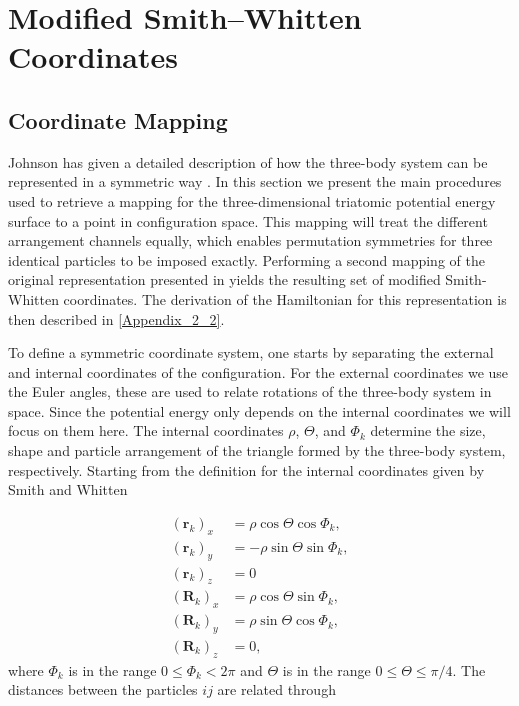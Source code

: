 \section{Modified Smith--Whitten Coordinates}\label{smith}
\subsection{Coordinate Mapping}\label{Appendix_2_1}
Johnson has given a detailed description of how the three-body system can be represented in a symmetric way \cite{Johnson1980}. In this section we present the main procedures used to retrieve a mapping for the three-dimensional triatomic potential energy surface to a point in configuration space. This mapping will treat the different arrangement channels equally, which enables permutation symmetries for three identical particles to be imposed exactly. Performing a second mapping of the original representation presented in \cite{Smith1962,Smith_Whitten1968} yields the resulting set of modified Smith-Whitten coordinates. The derivation of the Hamiltonian for this representation is then described in \cref{Appendix_2_2}. 

To define a symmetric coordinate system, one starts by separating the external and internal coordinates of the configuration. For the external coordinates we use the Euler angles, these are used to relate rotations of the three-body system in space. Since the potential energy only depends on the internal coordinates we will focus on them here. The internal coordinates $\rho$, $\Theta$, and $\Phi_k$ determine the size, shape and particle arrangement of the triangle formed by the three-body system, respectively. Starting from the definition for the internal coordinates given by Smith and Whitten \cite{Smith_Whitten1968}

\begin{equation}
\begin{aligned}
(\mathbf{r}_k)_x &= \rho \cos\Theta\cos\Phi_k,\\
(\mathbf{r}_k)_y &= -\rho \sin\Theta\sin\Phi_k,\\
(\mathbf{r}_k)_z &= 0\\
(\mathbf{R}_k)_x &= \rho \cos\Theta\sin\Phi_k,\\
(\mathbf{R}_k)_y &= \rho \sin\Theta\cos\Phi_k,\\
(\mathbf{R}_k)_z &= 0,
\end{aligned}   
\end{equation}
where $\Phi_k$ is in the range $0 \leq \Phi_k < 2\pi$ and $\Theta$ is in the range $0 \leq \Theta \leq \pi/4$. The distances between the particles $ij$ are related through 

